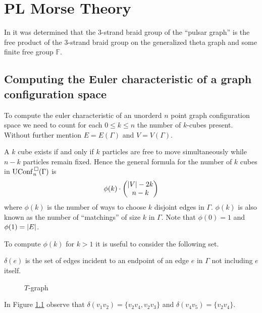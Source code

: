 \chapter{PL Morse Theory}
In \cite{appiah2024algebraicstructurehyperbolicgraph} it was determined that the 3-strand braid group of the ``pulsar graph''
is the free product of the 3-strand braid group on the generalized theta graph and some finite free group \(\mathbb{F}\).

\section{Computing the Euler characteristic of a graph configuration space}
To compute the euler characteristic of an unorderd \(n\) point graph configuration space we need to count
for each \(0 \le k \le n\) the number of \(k\)-cubes present.
Without further mention \(E = E(\Gamma)\) and \(V = V(\Gamma)\).

A \(k\) cube exists if and only if \(k\) particles are free to move simultaneously while \(n - k\)
particles remain fixed.
Hence the general formula for the number of \(k\) cubes in \(\mathrm{UConf}^{\,\square}_n(\Gamma)\) is
\[
    \phi(k) \cdot \begin{pmatrix}\left|V\right| - 2k \\ n - k\end{pmatrix}
\]
where \(\phi(k)\) is the number of ways to choose \(k\) disjoint edges in \(\Gamma\).
\(\phi(k)\) is also known as the number of ``matchings'' of size \(k\) in \(\Gamma\).
Note that \(\phi(0) = 1\) and \(\phi(1) = \left|E\right|\).

To compute \(\phi(k)\) for \(k > 1\) it is useful to consider the following set.
\begin{defn}
\(\delta(e)\) is the set of edges incident to an endpoint of an edge \(e\) in \(\Gamma\) not including \(e\) itself.
\end{defn}

\begin{figure}[h!]
    \centering
{}
\caption{\(T\)-graph}
\label{fig:tgraph}
\end{figure}
In Figure \ref{fig:tgraph} observe that \(\delta(v_1 v_2) = \{v_2 v_4, v_2 v_3\}\) and \(\delta(v_4 v_5) = \{v_2 v_4\}\).


